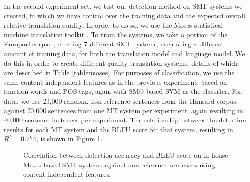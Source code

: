 \documentclass[11pt]{article}
\begin{document}
In the second experiment set, we test our detection method on SMT systems we created, in which we have control over the training data and the expected overall relative translation quality. In order to do so, we use the Moses statistical machine translation toolkit \cite{conf/acl/KoehnHBCFBCSMZDBCH07}. To train the systems, we take a portion of the Europarl corpus \cite{koehn2005epc}, creating 7 different SMT systems, each using a different amount of training data, for both the translation model and language model. We do this in order to create different quality translation systems, details of which are described in Table \ref{table:moses}. For purposes of classification, we use the same content independent features as in the previous experiment, based on function words and POS tags, again with SMO-based SVM as the classifier. For data, we use 20,000 random, non reference sentences from the Hansard corpus, against 20,000 sentences from one MT system per experiment, again resulting in 40,000 sentence instances per experiment. The relationship between the detection results for each MT system and the BLEU score for that system, resulting in $R^2 = 0.774$, is shown in Figure \ref{fig:detection-BLEU-correlation-moses}.

\begin{figure}
%
\caption{Correlation between detection accuracy and BLEU score on in-house Moses-based SMT systems against non-reference sentences using content independent features.}
\label{fig:detection-BLEU-correlation-moses}
\end{figure}
\end{document}

